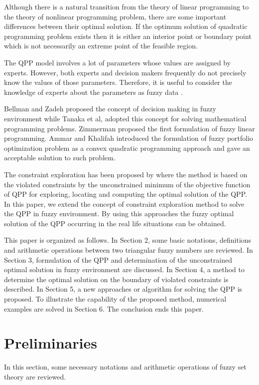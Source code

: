 \documentclass{iaesarticle3}
\begin{document}
Although there is a natural transition from the theory of linear programming to the theory of nonlinear programming problem, there are some important differences between their optimal solution. If the optimum solution of quadratic programming problem exists then it is either an interior point or boundary point which is not necessarily an extreme point of the feasible region.

The QPP model involves a lot of parameters whose values are assigned by experts. However, both experts and decision makers frequently do not precisely know the values of those parameters. Therefore, it is useful to consider the knowledge of experts about the parameters as fuzzy data \cite{zad}.

Bellman and Zadeh \cite{bel} proposed the concept of decision making in fuzzy environment while Tanaka et al, \cite{Tan} adopted this concept for solving mathematical programming problems. Zimmerman \cite{zim} proposed the first formulation of fuzzy linear programming. Ammar and Khalifah \cite{amm} introduced the formulation of fuzzy portfolio optimization problem as a convex quadratic programming approach and gave an acceptable solution to such problem.

The constraint exploration has been proposed by \cite{ism} where the method is based on the violated constraints by the unconstrained minimum of the objective function of QPP for exploring, locating and computing the optimal solution of the QPP. In this paper, we extend the concept of constraint exploration method to solve the QPP in fuzzy environment. By using this approaches the fuzzy optimal solution of the QPP occurring in the real life situations can be obtained.

This paper is organized as follows. In Section 2, some basic notations, definitions and arithmetic operations between two triangular fuzzy numbers are reviewed. In Section 3, formulation of the QPP and determination of the unconstrained optimal solution in fuzzy environment are discussed. In Section 4, a method to determine the optimal solution on the boundary of violated constraints is described. In Section 5, a new approaches or algorithm for solving the QPP is proposed. To illustrate the capability of the proposed method, numerical examples are solved in Section 6. The conclusion ends this paper.

\section{Preliminaries}\label{prem}
\label{}
In this section, some necessary notations and arithmetic operations of fuzzy set theory are reviewed.
\end{document}

